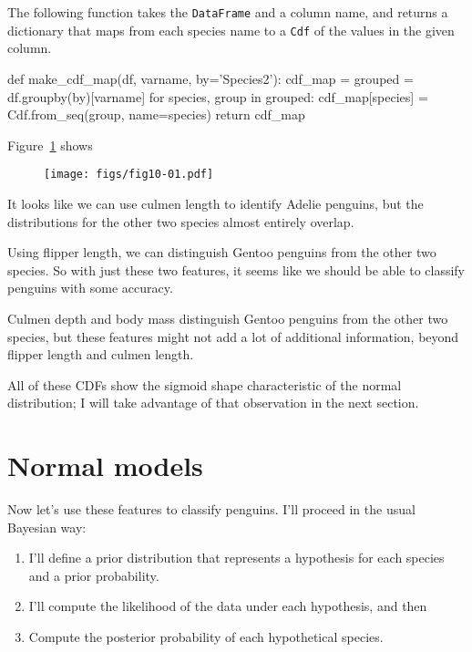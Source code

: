 \documentclass[12pt]{book}
\theoremstyle{exercise}
\newcommand{\py}[1]{{\tt #1}}%
\begin{document}
The following function takes the \py{DataFrame} and
a column name, and returns a dictionary that maps from each species name
to a \py{Cdf} of the values in the given column.

\begin{code}
def make_cdf_map(df, varname, by='Species2'):
    cdf_map = {}
    grouped = df.groupby(by)[varname]
    for species, group in grouped:
        cdf_map[species] = Cdf.from_seq(group, name=species)
    return cdf_map
\end{code}

Figure~\ref{fig10-01} shows

\begin{figure}
\centerline{\texttt{[image: figs/fig10-01.pdf]}}
\caption{}
\label{fig10-01}
\end{figure}

It looks like we can use culmen length to identify Adelie penguins, but
the distributions for the other two species almost entirely overlap.

Using flipper length, we can distinguish Gentoo penguins from the other
two species. So with just these two features, it seems like we should be
able to classify penguins with some accuracy.

Culmen depth and body mass distinguish Gentoo penguins from the other
two species, but these features might not add a lot of additional
information, beyond flipper length and culmen length.

All of these CDFs show the sigmoid shape characteristic of the normal
distribution; I will take advantage of that observation in the next
section.

\section{Normal models}
\label{normal-models}

Now let's use these features to classify penguins. I'll proceed in the
usual Bayesian way:

\begin{enumerate}

\item
  I'll define a prior distribution that represents a hypothesis for each
  species and a prior probability.
\item
  I'll compute the likelihood of the data under each hypothesis, and
  then
\item
  Compute the posterior probability of each hypothetical species.
\end{enumerate}
\end{document}
